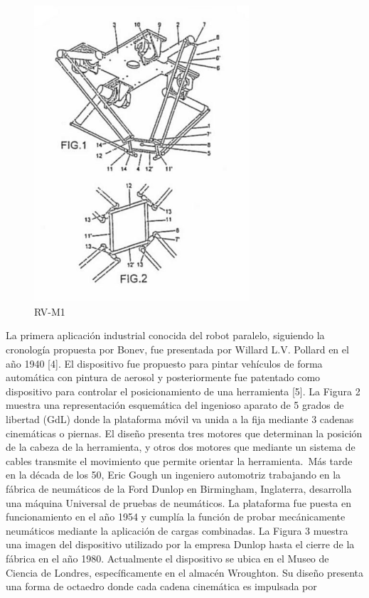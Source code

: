 \documentclass[letter,openright,12pt,spanish]{report}
\begin{document}
\begin{figure}[htp]
\centering
\includegraphics[width=8cm]{5.jpg}
\caption{RV-M1}
\label{Figura 1}
\end{figure}
La primera aplicación industrial conocida del robot paralelo, siguiendo la cronología propuesta por
Bonev, fue presentada por Willard L.V. Pollard en el año 1940 [4]. El dispositivo fue propuesto para
pintar vehículos de forma automática con pintura de aerosol y posteriormente fue patentado como
dispositivo para controlar el posicionamiento de una herramienta [5]. La Figura 2 muestra una
representación esquemática del ingenioso aparato de 5 grados de libertad (GdL) donde la plataforma
móvil va unida a la fija mediante 3 cadenas cinemáticas o piernas. El diseño presenta tres motores que
determinan la posición de la cabeza de la herramienta, y otros dos motores que mediante un sistema de
cables transmite el movimiento que permite orientar la herramienta.\
Más tarde en la década de los 50, Eric Gough un ingeniero automotriz trabajando en la fábrica de
neumáticos de la Ford Dunlop en Birmingham, Inglaterra, desarrolla una máquina Universal de pruebas
de neumáticos. La plataforma fue puesta en funcionamiento en el año 1954 y cumplía la función de
probar mecánicamente neumáticos mediante la aplicación de cargas combinadas. La Figura 3 muestra
una imagen del dispositivo utilizado por la empresa Dunlop hasta el cierre de la fábrica en el año 1980.
Actualmente el dispositivo se ubica en el Museo de Ciencia de Londres, específicamente en el almacén
Wroughton. Su diseño presenta una forma de octaedro donde cada cadena cinemática es impulsada por
\end{document}
